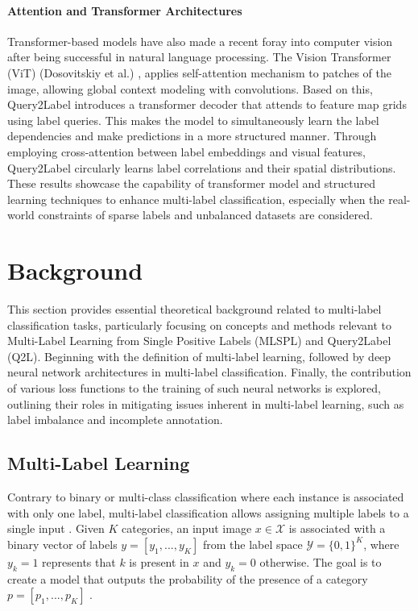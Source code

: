 \documentclass[lettersize,journal]{IEEEtran}
\begin{document}

\paragraph{Attention and Transformer Architectures}
Transformer-based models have also made a recent foray into computer vision after being successful in natural language processing. The Vision Transformer (ViT) (Dosovitskiy et al.) \cite{dosovitskiy2021imageworth16x16words}, applies self-attention mechanism to patches of the image, allowing global context modeling with convolutions. Based on this, Query2Label \cite{Query2Label} introduces a transformer decoder that attends to feature map grids using label queries. This makes the model to simultaneously learn the label dependencies and make predictions in a more structured manner. Through employing cross-attention between label embeddings and visual features, Query2Label circularly learns label correlations and their spatial distributions. These results showcase the capability of transformer model and structured learning techniques to enhance multi-label classification, especially when the real-world constraints of sparse labels and unbalanced datasets are considered.

\section{Background}
This section provides essential theoretical background related to multi-label classification tasks, particularly focusing on concepts and methods relevant to Multi-Label Learning from Single Positive Labels (MLSPL) and Query2Label (Q2L).  Beginning with the definition of multi-label learning, followed by deep neural network architectures in multi-label classification. Finally, the contribution of various loss functions to the training of such neural networks is explored, outlining their roles in mitigating issues inherent in multi-label learning, such as label imbalance and incomplete annotation.

\subsection{Multi-Label Learning}
Contrary to binary or multi-class classification where each instance is associated with only one label, multi-label classification allows assigning multiple labels to a single input \cite{mlsp}. Given $K$ categories, an input image $x\in \mathcal{X}$ is associated with a binary vector of labels $y=[y_1,...,y_K]$ from the label space $\mathcal{Y}=\{0,1\}^K$, where $y_k=1$ represents that $k$ is present in $x$ and $y_k=0$ otherwise. The goal is to create a model that outputs the probability of the presence of a category $p=[p_1,...,p_K]$ \cite{mlsp,Query2Label}.
\end{document}

